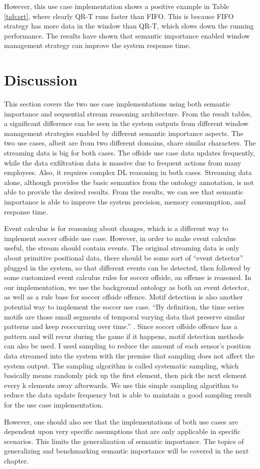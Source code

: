 However, this use case implementation shows a positive example in Table \ref{tab:srt}, where clearly QR-T runs faster than FIFO. 
This is because FIFO strategy has more data in the window than QR-T, which slows down the running performance.
The results have shown that semantic importance enabled window management strategy can improve the system response time. 
%
\section{Discussion}
This section covers the two use case implementations using both semantic importance and sequential stream reasoning architecture.
From the result tables, a significant difference can be seen in the system outputs from different window management strategies enabled by different semantic importance aspects. 
The two use cases, albeit are from two different domains, share similar characters. 
The streaming data is big for both cases. 
The offside use case data updates frequently, while the data exfiltration data is massive due to frequent actions from many employees. 
Also, it requires complex DL reasoning in both cases. 
Streaming data alone, although provides the basic semantics from the ontology annotation, is not able to provide the desired results. 
From the results, we can see that semantic importance is able to improve the system precision, memory consumption, and response time.

Event calculus \cite{khandelwal2013furthering} is for reasoning about changes, which is a different way to implement soccer offside use case. 
However, in order to make event calculus useful, the stream should contain events. 
The original streaming data is only about primitive positional data, there should be some sort of “event detector” plugged in the system, so that different events can be detected, 
then followed by some customized event calculus rules for soccer offside, an offense is reasoned. In our implementation, we use the background ontology as both an event detector, as well as a rule base for soccer offside offence. 
Motif detection \cite{chen2015context} is also another potential way to implement the soccer use case. 
``By definition, the time series motifs are those small segments of temporal varying data that preserve similar patterns and keep reoccurring over time.'' \cite{chen2015context}. 
Since soccer offside offence has a pattern and will recur during the game if it happens, motif detection methods can also be used.
I used sampling to reduce the amount of each sensor’s position data streamed into the system with the premise that sampling does not affect the system output. 
The sampling algorithm is called systematic sampling, which basically means randomly pick up the first element, then pick the next element every k elements away afterwards. 
We use this simple sampling algorithm to reduce the data update frequency but is able to maintain a good sampling result for the use case implementation.

However, one should also see that the implementations of both use cases are dependent upon very specific assumptions that are only applicable in specific scenarios.
This limits the generalization of semantic importance. 
The topics of generalizing and benchmarking semantic importance will be covered in the next chapter. 